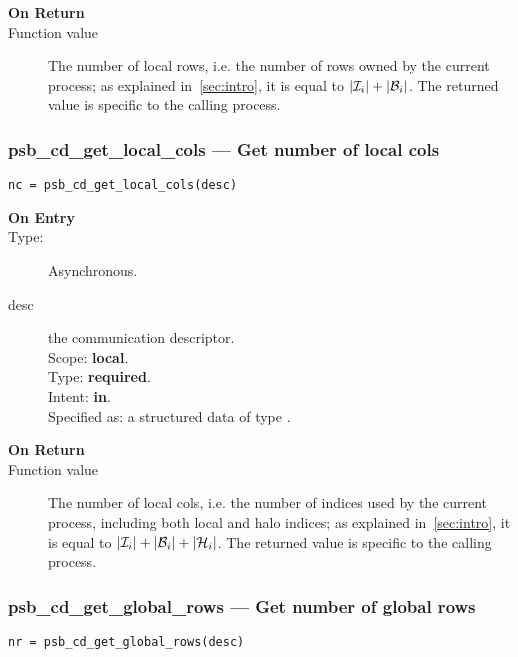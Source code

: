 \begin{description}
\item[\bf On Return]
\item[Function value] The number of local rows, i.e. the number of
  rows owned by the current process; as explained in~\ref{sec:intro},
  it is equal to $|{\cal I}_i| + |{\cal B}_i|$. The returned value is
  specific to the calling process. 
\end{description}


\subsubsection*{psb\_cd\_get\_local\_cols --- Get number of local cols}

\begin{verbatim}
nc = psb_cd_get_local_cols(desc)
\end{verbatim}

\begin{description}
\item[\bf On Entry]
\item[Type:] Asynchronous.
\item[desc] the communication descriptor.\\
Scope: {\bf local}.\\
Type: {\bf required}.\\
Intent: {\bf in}.\\
Specified as: a structured data of type \descdata.
\end{description}

\begin{description}
\item[\bf On Return]
\item[Function value] The number of local cols, i.e. the number of
  indices used by the current process, including both local and halo
  indices; as explained in~\ref{sec:intro}, 
  it is equal to  $|{\cal I}_i| + |{\cal B}_i| +|{\cal H}_i|$. The
  returned value is specific to the calling process. 
\end{description}


\subsubsection*{psb\_cd\_get\_global\_rows --- Get number of global rows}

\begin{verbatim}
nr = psb_cd_get_global_rows(desc)
\end{verbatim}

